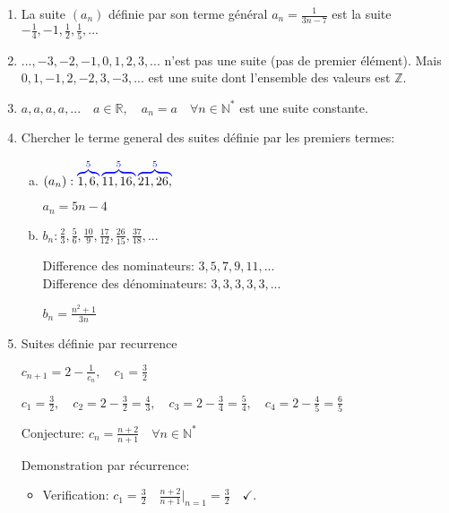 \documentclass[
    11pt,
    a4paper,
    oneside,
    headinlcude, footinclude,
    twoside,
]{report}
\begin{document}
\begin{enumerate}[1)]
\item La suite $(a _{n})$ définie par son terme général $a _{n} = \frac{1}{3n-7}$
est la suite $-\frac{1}{4}, -1, \frac{1}{2}, \frac{1}{5}, ...$

\item $..., -3, -2, -1, 0, 1, 2, 3, ...$ n'est pas une suite (pas de
premier élément). Mais $0, 1, -1, 2, -2, 3, -3, ...$ est une suite
dont l'ensemble des valeurs est $\mathbb{Z}$.

\item $a, a, a, a, ... \quad a \in \mathbb{R},\quad a _{n} = a \quad \forall n \in \mathbb{N} ^{\ast}$ 
est une suite constante.

\item Chercher le terme general des suites définie par les premiers
termes:
\begin{enumerate}[a)]
\item  $(a _{n}): \color{blue}\overbrace{\color{black}1, 6,}^\text{\color{blue}$5$}
\overbrace{\color{black}11, 16,}^\text{\color{blue}$5$}
\overbrace{\color{black}21, 26,}^\text{\color{blue}$5$}$

$a _{n} = 5n - 4$

\item  $b _{n}: \frac{2}{3}, \frac{5}{6}, \frac{10}{9},
\frac{17}{12}, \frac{26}{15}, \frac{37}{18}, ...$

Difference des nominateurs: $3, 5, 7, 9, 11, ...$\\
Difference des dénominateurs: $3, 3, 3, 3, 3, ...$

$b _{n} = \frac{n ^{2} + 1}{3n}$
\end{enumerate}

\item Suites définie par recurrence

$c _{n+1} = 2 - \frac{1}{c _{n}}, \quad c _{1} = \frac{3}{2}$

$c _{1} = \frac{3}{2}, \quad c _{2} = 2 - \frac{3}{2} = \frac{4}{3}, \quad c _{3} = 2
- \frac{3}{4} = \frac{5}{4}, \quad c _{4} = 2 - \frac{4}{5} = \frac{6}{5}$

Conjecture: $c _{n} = \frac{n+2}{n+1} \quad \forall n \in \mathbb{N} ^{\ast}$

Demonstration par récurrence:

\begin{itemize}
\item Verification: $c _{1} = \frac{3}{2} \quad \frac{n+2}{n+1}|_{n=1}
= \frac{3}{2} \quad \checkmark.$


\end{itemize}
\end{enumerate}
\end{document}
